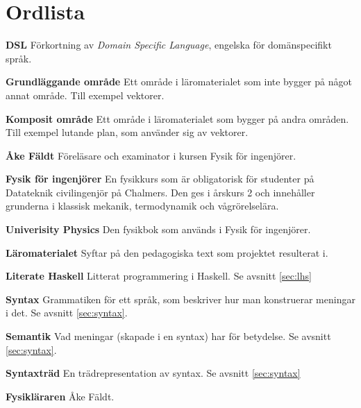 
\chapter*{Ordlista}


\textbf{DSL} Förkortning av \textit{Domain Specific Language}, engelska för domänspecifikt språk.

\textbf{Grundläggande område} Ett område i läromaterialet som inte bygger på något annat område. Till exempel vektorer.

\textbf{Komposit område} Ett område i läromaterialet som bygger på andra områden. Till exempel lutande plan, som använder sig av vektorer.

\textbf{Åke Fäldt} Föreläsare och examinator i kursen Fysik för ingenjörer.

\textbf{Fysik för ingenjörer} En fysikkurs som är obligatorisk för studenter på Datateknik civilingenjör på Chalmers. Den ges i årskurs 2 och innehåller grunderna i klassisk mekanik, termodynamik och vågrörelselära.

\textbf{Univerisity Physics} Den fysikbok som används i Fysik för ingenjörer.

\textbf{Läromaterialet} Syftar på den pedagogiska text som projektet resulterat i.

\textbf{Literate Haskell} Litterat programmering i Haskell. Se avsnitt \ref{sec:lhs}

\textbf{Syntax} Grammatiken för ett språk, som beskriver hur man konstruerar meningar i det. Se avsnitt \ref{sec:syntax}.

\textbf{Semantik} Vad meningar (skapade i en syntax) har för betydelse. Se avsnitt \ref{sec:syntax}.

\textbf{Syntaxträd} En trädrepresentation av syntax. Se avsnitt \ref{sec:syntax}

\textbf{Fysikläraren} Åke Fäldt.
